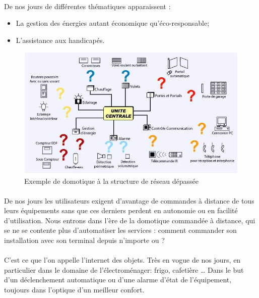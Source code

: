         \paragraph{}
De nos jours de différentes thématiques apparaissent :
            \begin{itemize}
                \item La gestion des énergies autant économique qu'éco-responsable;
                \item L'assistance aux handicapés.
            \end{itemize}
        \begin{figure}[h]
            \begin{center}
                \includegraphics[scale=0.5]{./images/cpl/imageUniteCentrale.jpg}
            \end{center}
                \caption{ Exemple de domotique à la structure de réseau dépassée } %
                \label{Exemple de domotique avec commande centrale}
        \end{figure}
        \paragraph{}
De nos jours les utilisateurs exigent d'avantage de commandes à distance de tous leurs équipements sans que ces derniers perdent en autonomie ou en facilité d'utilisation.
Nous entrons dans l’ère de la domotique commandée à distance, qui se ne se contente plus d'automatiser les services :
comment commander son installation avec son terminal depuis n'importe ou ?
        \paragraph{}
C’est ce que l’on appelle l’internet des objets.
Très en vogue de nos jours, en particulier dans le domaine de l’électroménager: frigo, cafetière …
Dans le but d'un déclenchement automatique ou d'une alarme d'état de l'équipement, toujours dans l’optique d’un meilleur confort.
